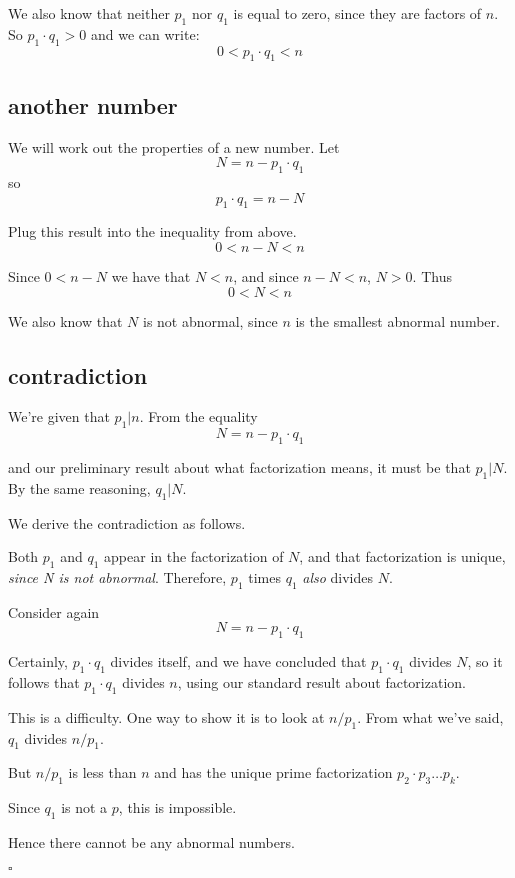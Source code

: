 \documentclass[11pt, oneside]{article}
\begin{document}
We also know that neither $p_1$ nor $q_1$ is equal to zero, since they are factors of $n$.  So $p_1 \cdot q_1 > 0$ and we can write:
\[ 0 < p_1 \cdot q_1 < n \]

\subsection*{another number} 

We will work out the properties of a new number.  Let 
\[ N = n - p_1 \cdot q_1 \]
so
\[ p_1 \cdot q_1 = n - N \]

Plug this result into the inequality from above.
\[ 0 < n - N < n \]

Since $0 < n - N$ we have that $N < n$, and since $n - N < n$,  $N > 0$.   Thus
\[ 0 < N < n \]

We also know that $N$ is not abnormal, since $n$ is the smallest abnormal number.

\subsection*{contradiction} 
We're given that $p_1 | n$.  From the equality 
\[ N = n - p_1 \cdot q_1 \]

and our preliminary result about what factorization means, it must be that $p_1 | N$. By the same reasoning, $q_1 | N$.  

We derive the contradiction as follows.

Both $p_1$ and $q_1$ appear in the factorization of $N$, and that factorization is unique, \emph{since N is not abnormal}.  Therefore, $p_1$ times $q_1$ \emph{also} divides $N$.  

Consider again
\[ N = n - p_1 \cdot q_1 \]

Certainly, $p_1 \cdot q_1$ divides itself, and we have concluded that $p_1 \cdot q_1$ divides $N$, so it follows that $p_1 \cdot q_1$ divides $n$, using our standard result about factorization.  

This is a difficulty.  One way to show it is to look at $n/p_1$.  From what we've said, $q_1$ divides $n/p_1$.  

But $n/p_1$ is less than $n$ and has the unique prime factorization $p_2 \cdot p_3 \dots p_k$.

Since $q_1$ is not a $p$, this is impossible.  

Hence there cannot be any abnormal numbers.

$\square$
\end{document}
